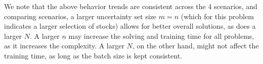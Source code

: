 We note that the above behavior trends are consistent across the 4 scenarios, and comparing scenarios, a larger uncertainty set size $m = n$ (which for this problem indicates a larger selection of stocks) allows for better overall solutions, as does a larger $N$. 
A larger $n$ may increase the solving and training time for all problems, as it increases the complexity. A larger $N$, on the other hand, might not affect the training time, as long as the batch size is kept consistent. 
